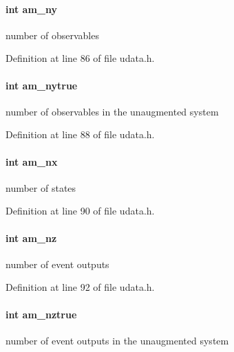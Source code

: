 \paragraph[{am\+\_\+ny}]{\setlength{\rightskip}{0pt plus 5cm}int am\+\_\+ny}\label{struct_user_data_a1c8d4eb301c60c34dc4870faca7ce5a4}
number of observables 

Definition at line 86 of file udata.\+h.

\hypertarget{struct_user_data_a52aef12adf85a9a7361e79608bcf0e91}{}
\paragraph[{am\+\_\+nytrue}]{\setlength{\rightskip}{0pt plus 5cm}int am\+\_\+nytrue}\label{struct_user_data_a52aef12adf85a9a7361e79608bcf0e91}
number of observables in the unaugmented system 

Definition at line 88 of file udata.\+h.

\hypertarget{struct_user_data_a00ba9cf99f8f02b663241bb76b76ce96}{}
\paragraph[{am\+\_\+nx}]{\setlength{\rightskip}{0pt plus 5cm}int am\+\_\+nx}\label{struct_user_data_a00ba9cf99f8f02b663241bb76b76ce96}
number of states 

Definition at line 90 of file udata.\+h.

\hypertarget{struct_user_data_af6f8dfb3615c37e31bc8a1b232d2c99e}{}
\paragraph[{am\+\_\+nz}]{\setlength{\rightskip}{0pt plus 5cm}int am\+\_\+nz}\label{struct_user_data_af6f8dfb3615c37e31bc8a1b232d2c99e}
number of event outputs 

Definition at line 92 of file udata.\+h.

\hypertarget{struct_user_data_ae8335840fdbd8b91daef2c0affee61dc}{}
\paragraph[{am\+\_\+nztrue}]{\setlength{\rightskip}{0pt plus 5cm}int am\+\_\+nztrue}\label{struct_user_data_ae8335840fdbd8b91daef2c0affee61dc}
number of event outputs in the unaugmented system 

